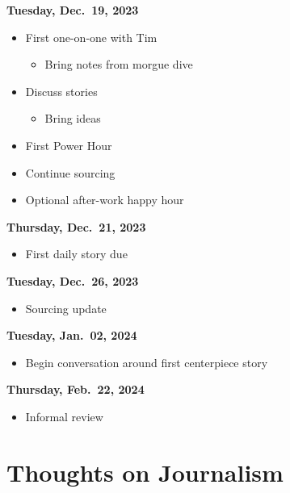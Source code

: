 \documentclass[
  12pt,
  american,
  letterpaperpaper,
  extrafontsizes,onecolumn,openright
  ]{memoir}
\providecommand{\tightlist}{%
  \setlength{\itemsep}{0pt}\setlength{\parskip}{0pt}}
\begin{document}
\textbf{Tuesday, Dec.~19, 2023}

\begin{itemize}
\tightlist
\item
  First one-on-one with Tim

  \begin{itemize}
  \tightlist
  \item
    Bring notes from morgue dive
  \end{itemize}
\item
  Discuss stories

  \begin{itemize}
  \tightlist
  \item
    Bring ideas
  \end{itemize}
\item
  First Power Hour
\item
  Continue sourcing
\item
  Optional after-work happy hour
\end{itemize}

\textbf{Thursday, Dec.~21, 2023}

\begin{itemize}
\tightlist
\item
  First daily story due
\end{itemize}

\textbf{Tuesday, Dec.~26, 2023}

\begin{itemize}
\tightlist
\item
  Sourcing update
\end{itemize}

\textbf{Tuesday, Jan.~02, 2024}

\begin{itemize}
\tightlist
\item
  Begin conversation around first centerpiece story
\end{itemize}

\textbf{Thursday, Feb.~22, 2024}

\begin{itemize}
\tightlist
\item
  Informal review
\end{itemize}

\mainmatter

\hypertarget{thoughts-on-journalism}{%
\chapter*{Thoughts on Journalism}\label{thoughts-on-journalism}}
\end{document}
